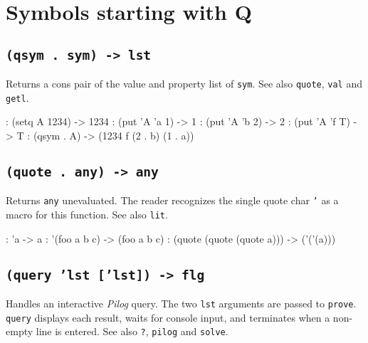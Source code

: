 %
%
%



\chapter{Symbols starting with Q}
\label{cha:func-ref-Q-functions-starting-with-Q}
 
\section*{\texttt{(qsym . sym) -> lst}}
\label{sec:func-ref-Q-(qsym . sym) -> lst}


Returns a cons pair of the value and property list of \texttt{sym}. See also
\texttt{quote}, \texttt{val} and \texttt{getl}.


\begin{wideverbatim}
: (setq A 1234)
-> 1234
: (put 'A 'a 1)
-> 1
: (put 'A 'b 2)
-> 2
: (put 'A 'f T)
-> T
: (qsym . A)
-> (1234 f (2 . b) (1 . a))
\end{wideverbatim}

 
\section*{\texttt{(quote . any) -> any}}
\label{sec:func-ref-Q-(quote . any) -> any}


Returns \texttt{any} unevaluated. The reader recognizes the single quote char
\texttt{'} as a macro for this function. See also \texttt{lit}.


\begin{wideverbatim}
: 'a
-> a
: '(foo a b c)
-> (foo a b c)
: (quote (quote (quote a)))
-> ('('(a)))
\end{wideverbatim}

 
\section*{\texttt{(query 'lst ['lst]) -> flg}}
\label{sec:func-ref-Q-(query 'lst ['lst]) -> flg}


Handles an interactive \emph{Pilog} query. The two \texttt{lst}
arguments are passed to \texttt{prove}. \texttt{query} displays each result, waits for
console input, and terminates when a non-empty line is entered. See also
\texttt{?}, \texttt{pilog} and \texttt{solve}.


